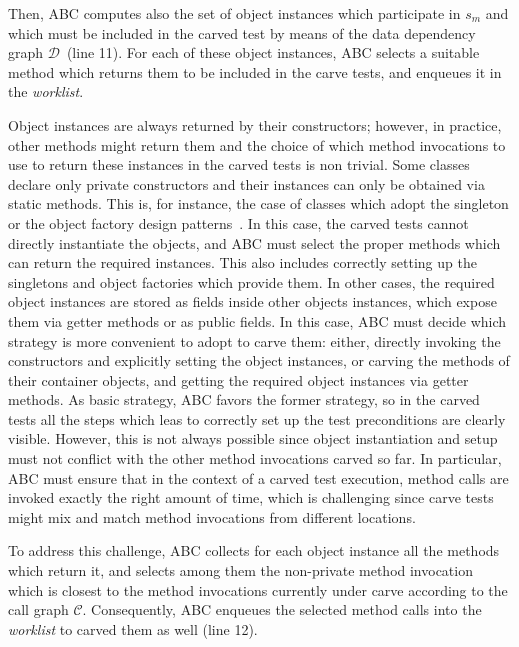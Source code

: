 \documentclass[10pt,conference]{IEEEtran}
\newcommand{\worklist}{\textit{worklist}\xspace}
\newcommand{\abc}{\textsf{ABC}\xspace}
\begin{document}
Then, \abc computes also the set of object instances which participate in $s_m$ and which must be included in the carved
test by means of the data dependency graph $\mathcal{D}$~(line 11). For each of these object instances, \abc selects a
suitable method which returns them to be included in the carve tests, and enqueues it in the \worklist.

Object instances are always returned by their constructors; however, in practice, other methods might return them and the choice
of which method invocations to use to return these instances in the carved tests is non trivial.
%
Some classes declare only private constructors and their instances can only be obtained via static methods. 
This is, for instance, the case of classes which adopt the singleton or the object factory design patterns~\cite{designpatterns}.
%
In this case, the carved tests cannot directly instantiate the objects, and \abc must select the proper methods
which can return the required instances. This also includes correctly setting up the singletons and object factories which
provide them.
%
In other cases, the required object instances are stored as fields inside other objects instances, which expose them
via getter methods or as public fields. In this case, \abc must decide which strategy is more convenient to adopt
to carve them: either, directly invoking the constructors and explicitly setting the object instances, or carving the
methods of their container objects, and getting the required object instances via getter methods.
%
As basic strategy, \abc favors the former strategy, so in the carved tests all the steps which leas to correctly set up
the test preconditions are clearly visible. However, this is not always possible since object instantiation and setup must
not conflict with the other method invocations carved so far. In particular, \abc must ensure that in the context of a carved
test execution, method calls are invoked exactly the right amount of time, which is challenging since carve tests might mix 
and match method invocations from different locations.

To address this challenge, \abc collects for each object instance all the methods which return it, 
and selects among them the non-private method invocation which is closest to the method invocations currently
under carve according to the call graph $\mathcal{C}$. Consequently, \abc enqueues the selected method calls into
the \worklist to carved them as well (line 12).
\end{document}
